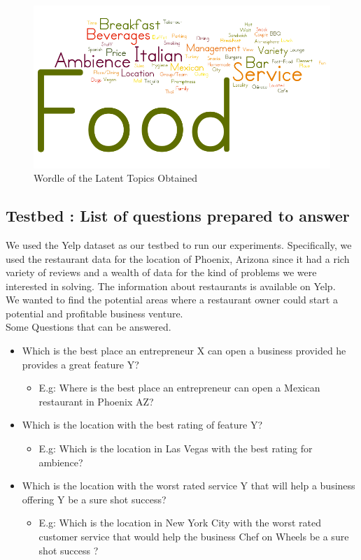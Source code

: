 \documentclass[12pt]{article} %
\begin{document}
\newpage

\begin{figure}[h]
\begin{center}
\includegraphics[width=6in]{wordle.png}
\caption{Wordle of the Latent Topics Obtained}
\end{center}
\end{figure}

\subsection{Testbed : List of questions prepared to answer}
We used the Yelp dataset as our testbed to run our experiments. Specifically, we used the restaurant data for the location of Phoenix, Arizona since it had a rich variety of reviews and a wealth of data for the kind of problems we were interested in solving. The information about restaurants is available on Yelp.\\
We wanted to find the potential areas where a restaurant owner could start a potential and profitable business venture.\\

Some Questions that can be answered.\\
\begin{itemize}
\item Which is the best place an entrepreneur X can open a business provided he provides a great feature Y?
	\begin{itemize}
		\item E.g: Where is the best place an entrepreneur can open a Mexican restaurant in Phoenix AZ?
	\end{itemize}
\item Which is the location with the best rating of feature Y?
	\begin{itemize}
		\item E.g: Which is the location in Las Vegas with the best rating for ambience?
	\end{itemize}
\item Which is the location with the worst rated service Y that will help a business offering Y be a sure shot success?
	\begin{itemize}
		\item E.g: Which is the location in New York City with the worst rated customer service that would help the business Chef on Wheels be a sure shot success ?
	\end{itemize}
\end{itemize}
\end{document}
